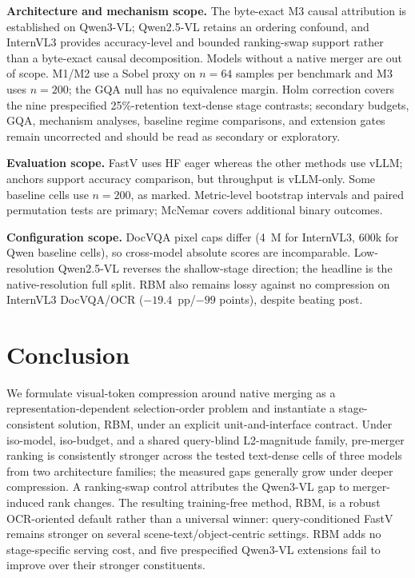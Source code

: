 \documentclass[journal]{IEEEtran}
\begin{document}
\textbf{Architecture and mechanism scope.} The byte-exact M3 causal attribution
is established on Qwen3-VL; Qwen2.5-VL retains an ordering confound, and
InternVL3 provides accuracy-level and bounded ranking-swap support rather than a
byte-exact causal decomposition. Models without a native merger are out of
scope. M1/M2 use a Sobel proxy on $n=64$ samples per benchmark and M3 uses
$n=200$; the GQA null has no equivalence margin. Holm correction covers the
nine prespecified 25\%-retention text-dense stage contrasts; secondary budgets,
GQA, mechanism analyses, baseline regime comparisons, and extension gates
remain uncorrected and should be read as secondary or exploratory.

\textbf{Evaluation scope.} FastV uses HF eager whereas the other methods use
vLLM; anchors support accuracy comparison, but throughput is vLLM-only. Some
baseline cells use $n=200$, as marked. Metric-level bootstrap intervals and
paired permutation tests are primary; McNemar covers additional binary outcomes.

\textbf{Configuration scope.} DocVQA pixel caps differ (4~M for InternVL3,
600k for Qwen baseline cells), so cross-model absolute scores are incomparable.
Low-resolution Qwen2.5-VL reverses the shallow-stage direction; the headline is
the native-resolution full split. RBM also remains lossy against no compression
on InternVL3 DocVQA/OCR ($-19.4$~pp/$-99$ points), despite beating post.

\section{Conclusion}\label{sec:conclusion}

We formulate visual-token compression around native merging as a
representation-dependent selection-order problem and instantiate a
stage-consistent solution, RBM, under an explicit unit-and-interface contract.
Under iso-model, iso-budget, and a shared query-blind L2-magnitude family,
pre-merger ranking is consistently stronger across the tested text-dense cells
of three models from two architecture families;
the measured gaps generally grow under deeper compression. A ranking-swap
control attributes the Qwen3-VL gap to merger-induced rank changes. The
resulting training-free method, RBM, is a
robust OCR-oriented default rather than a universal winner: query-conditioned
FastV remains stronger on several scene-text/object-centric settings. RBM adds
no stage-specific serving cost, and five prespecified Qwen3-VL extensions fail
to improve over their stronger constituents.



\end{document}
